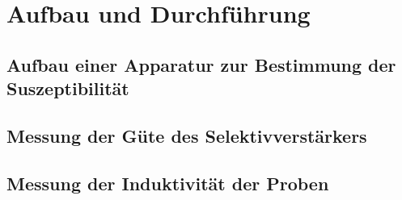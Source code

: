 
\section{Aufbau und Durchführung}

\subsection{Aufbau einer Apparatur zur Bestimmung der Suszeptibilität}

\subsection{Messung der Güte des Selektivverstärkers}

\subsection{Messung der Induktivität der Proben}

